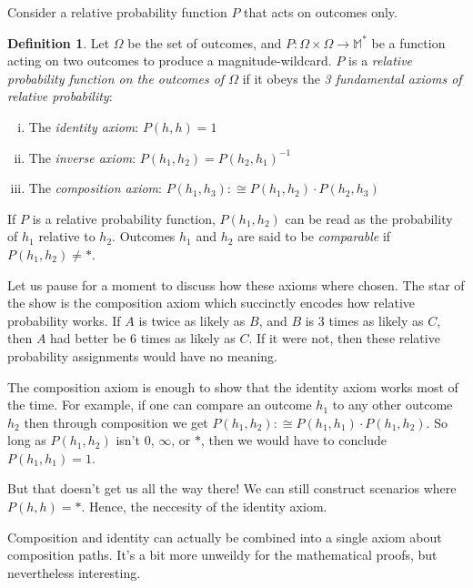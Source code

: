 \documentclass[twoside]{article}
\theoremstyle{plain}%
\theoremstyle{definition}
\newtheorem{definition}{Definition}[section]
\theoremstyle{remark}
\begin{document}
Consider a relative probability function \(P\) that acts on outcomes only.

\begin{definition}
\label{def:fundamental_laws}
Let \(\Omega\) be the set of outcomes, and \(P: \Omega \times \Omega \rightarrow \mathbb{M}^*\) be a function acting on two outcomes to produce a magnitude-wildcard. \(P\) is a \textit{relative probability function on the outcomes of \(\Omega\)} if it obeys the \textit{3 fundamental axioms of relative probability}:

\begin{enumerate}[(i)]
\item The \textit{identity axiom}: \(P(h, h) = 1\)
\item The \textit{inverse axiom}: \(P(h_1, h_2) = P(h_2, h_1)^{-1}\)
\item The \textit{composition axiom}: \(P(h_1, h_3) :\cong P(h_1, h_2) \cdot P(h_2, h_3)\)
\end{enumerate}

\end{definition}

If \(P\) is a relative probability function, \(P(h_1, h_2)\) can be read as the probability of \(h_1\) relative to \(h_2\). Outcomes \(h_1\) and \(h_2\) are said to be \textit{comparable} if \(P(h_1, h_2) \neq \ast\).

Let us pause for a moment to discuss how these axioms where chosen. The star of the show is the composition axiom which succinctly encodes how relative probability works. If \(A\) is twice as likely as \(B\), and \(B\) is 3 times as likely as \(C\), then \(A\) had better be 6 times as likely as \(C\). If it were not, then these relative probability assignments would have no meaning.

The composition axiom is enough to show that the identity axiom works most of the time. For example, if one can compare an outcome \(h_1\) to any other outcome \(h_2\) then through composition we get \(P(h_1, h_2) :\cong P(h_1, h_1) \cdot P(h_1, h_2)\). So long as \(P(h_1, h_2)\) isn't \(0\), \(\infty\), or \(\ast\), then we would have to conclude \(P(h_1, h_1) = 1\).

But that doesn't get us all the way there! We can still construct scenarios where \(P(h, h) = \ast\). Hence, the neccesity of the identity axiom.

Composition and identity can actually be combined into a single axiom about composition paths. It's a bit more unweildy for the mathematical proofs, but nevertheless interesting.
\end{document}
